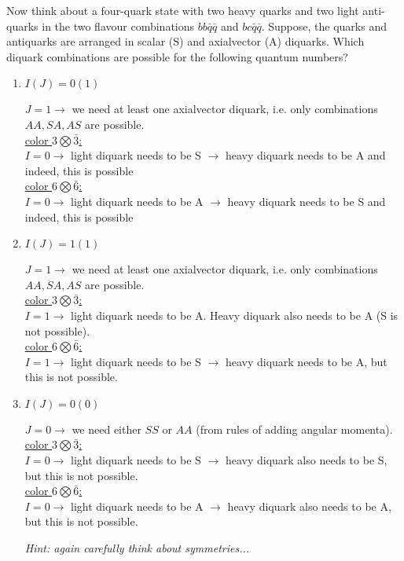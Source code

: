 

Now think about a four-quark state with two heavy quarks and two light anti-quarks in the two 
flavour combinations $bb\bar{q}\bar{q}$ and $bc\bar{q}\bar{q}$. Suppose, the quarks and antiquarks are 
arranged in scalar (S) and axialvector (A) diquarks. Which diquark combinations are possible for the following quantum numbers?

\begin{enumerate}
	\item $I(J) = 0(1)$
	      
	      \begin{solution}
		      $J=1 \rightarrow$ we need at least one axialvector diquark, i.e. only combinations $AA, SA, AS$ are possible.\\ 
		      \underline{color $3 \bigotimes \bar{3}$:}\\
		      $I=0 \rightarrow$ light diquark needs to be S $\rightarrow$ heavy diquark needs to be A and indeed, this is possible\\
		      \underline{color $6 \bigotimes \bar{6}$:}\\
		      $I=0 \rightarrow$ light diquark needs to be A $\rightarrow$ heavy diquark needs to be S and indeed, this is possible		
	      \end{solution}
	      
	\item $I(J) = 1(1)$
	      
	      \begin{solution}
		      $J=1 \rightarrow$ we need at least one axialvector diquark, i.e. only combinations $AA, SA, AS$ are possible.\\ 
		      \underline{color $3 \bigotimes \bar{3}$:}\\
		      $I=1 \rightarrow$ light diquark needs to be A. Heavy diquark also needs to be A (S is not possible).\\
		      \underline{color $6 \bigotimes \bar{6}$:}\\
		      $I=1 \rightarrow$ light diquark needs to be S $\rightarrow$ heavy diquark needs to be A, but this is not possible.		
	      \end{solution}
	      
	\item $I(J) = 0(0)$
	      
	      \begin{solution}
		      $J=0 \rightarrow$ we need either $SS$ or $AA$ (from rules of adding angular momenta).\\ 
		      \underline{color $3 \bigotimes \bar{3}$:}\\
		      $I=0 \rightarrow$ light diquark needs to be S $\rightarrow$ heavy diquark also needs to be S, but this is not possible.\\
		      \underline{color $6 \bigotimes \bar{6}$:}\\
		      $I=0 \rightarrow$ light diquark needs to be A $\rightarrow$ heavy diquark also needs to be A, but this is not possible.		
	      \end{solution}
	      
	      {\em Hint: again carefully think about symmetries...}
	      
	      
	      
\end{enumerate}